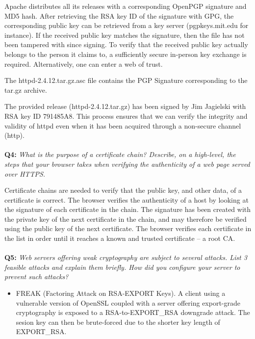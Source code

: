 Apache distributes all its releases with a corresponding OpenPGP signature\cite{pgp} and MD5 hash.
After retrieving the RSA key ID of the signature with GPG\cite{gpg}, the corresponding public key can be retrieved from a key server (pgpkeys.mit.edu for instance).
If the received public key matches the signature, then the file has not been tampered with since signing.
To verify that the received public key actually belongs to the person it claims to, a sufficiently secure in-person key exchange is required.
Alternatively, one can enter a web of trust.

The httpd-2.4.12.tar.gz.asc file contains the PGP Signature corresponding to the tar.gz archive.

The provided release (httpd-2.4.12.tar.gz) has been signed by Jim Jagielski with RSA key ID 791485A8.
This process ensures that we can verify the integrity and validity of httpd even when it has been acquired through a non-secure channel (http).

\paragraph{}
\textbf{Q4:}
\textit{What is the purpose of a certificate chain? Describe, on a high-level, the steps that your browser takes when verifying the authenticity of a web page served over HTTPS.}

Certificate chains are needed to verify that the public key, and other data, of a certificate is correct.
The browser verifies the authenticity of a host by looking at the signature of each certificate in the chain.
The signature has been created with the private key of the next certificate in the chain, and may therefore be verified using the public key of the next certificate.
The browser verifies each certificate in the list in order until it reaches a known and trusted certificate – a root CA.\cite{x509}

\paragraph{}
\textbf{Q5:}
\textit{Web servers offering weak cryptography are subject to several attacks. List 3 feasible attacks and explain them briefly. How did you configure your server to prevent such attacks?}

\begin{itemize}
    \item
        FREAK (Factoring Attack on RSA-EXPORT Keys)\cite{freak-ssl-tls}.
        A client using a vulnerable version of OpenSSL coupled with a server offering export-grade cryptography is exposed to a RSA-to-EXPORT\_RSA downgrade attack.
        The sesion key can then be brute-forced due to the shorter key length of EXPORT\_RSA.

\end{itemize}

